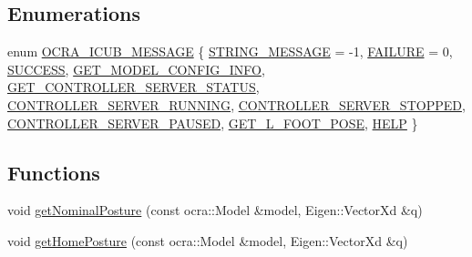 \subsection*{\-Enumerations}
\begin{DoxyCompactItemize}
\item 
enum \hyperlink{namespaceocra__icub_afbd2db66b68005fb7cfac19210caf83f}{\-O\-C\-R\-A\-\_\-\-I\-C\-U\-B\-\_\-\-M\-E\-S\-S\-A\-G\-E} \{ \*
\hyperlink{namespaceocra__icub_afbd2db66b68005fb7cfac19210caf83fafa982af27b4e13f109d8769472d75217}{\-S\-T\-R\-I\-N\-G\-\_\-\-M\-E\-S\-S\-A\-G\-E} =  -\/1, 
\hyperlink{namespaceocra__icub_afbd2db66b68005fb7cfac19210caf83faa0c1832978fad84ef108d48265af68d2}{\-F\-A\-I\-L\-U\-R\-E} =  0, 
\hyperlink{namespaceocra__icub_afbd2db66b68005fb7cfac19210caf83fa67c96e3afcb39533f69c97dc5e9734e5}{\-S\-U\-C\-C\-E\-S\-S}, 
\hyperlink{namespaceocra__icub_afbd2db66b68005fb7cfac19210caf83fae8fe02f5f3b1b11d4749e720b9ec3636}{\-G\-E\-T\-\_\-\-M\-O\-D\-E\-L\-\_\-\-C\-O\-N\-F\-I\-G\-\_\-\-I\-N\-F\-O}, 
\*
\hyperlink{namespaceocra__icub_afbd2db66b68005fb7cfac19210caf83fa772ab917d1ff28db029af9271208a69a}{\-G\-E\-T\-\_\-\-C\-O\-N\-T\-R\-O\-L\-L\-E\-R\-\_\-\-S\-E\-R\-V\-E\-R\-\_\-\-S\-T\-A\-T\-U\-S}, 
\hyperlink{namespaceocra__icub_afbd2db66b68005fb7cfac19210caf83fa5dee3cfa0ab6c29f5546bc9e30c0aef5}{\-C\-O\-N\-T\-R\-O\-L\-L\-E\-R\-\_\-\-S\-E\-R\-V\-E\-R\-\_\-\-R\-U\-N\-N\-I\-N\-G}, 
\hyperlink{namespaceocra__icub_afbd2db66b68005fb7cfac19210caf83fafd31e40d18e553fc09105d360455bc49}{\-C\-O\-N\-T\-R\-O\-L\-L\-E\-R\-\_\-\-S\-E\-R\-V\-E\-R\-\_\-\-S\-T\-O\-P\-P\-E\-D}, 
\hyperlink{namespaceocra__icub_afbd2db66b68005fb7cfac19210caf83fa48ad7962d035a58257a0381872ce27b1}{\-C\-O\-N\-T\-R\-O\-L\-L\-E\-R\-\_\-\-S\-E\-R\-V\-E\-R\-\_\-\-P\-A\-U\-S\-E\-D}, 
\*
\hyperlink{namespaceocra__icub_afbd2db66b68005fb7cfac19210caf83fafd78d107914396f475c3b12d2b31ea2a}{\-G\-E\-T\-\_\-\-L\-\_\-\-F\-O\-O\-T\-\_\-\-P\-O\-S\-E}, 
\hyperlink{namespaceocra__icub_afbd2db66b68005fb7cfac19210caf83fae7c9fa2563b6c0b14e5b05d1794dac36}{\-H\-E\-L\-P}
 \}
\end{DoxyCompactItemize}
\subsection*{\-Functions}
\begin{DoxyCompactItemize}
\item 
void \hyperlink{namespaceocra__icub_a07ffe33877389b6b111944e8a666e221}{get\-Nominal\-Posture} (const ocra\-::\-Model \&model, \-Eigen\-::\-Vector\-Xd \&q)
\item 
void \hyperlink{namespaceocra__icub_a91c3caf94014ea9988e56dd2572768ce}{get\-Home\-Posture} (const ocra\-::\-Model \&model, \-Eigen\-::\-Vector\-Xd \&q)
\end{DoxyCompactItemize}

